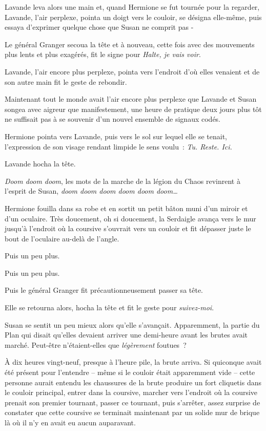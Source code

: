 Lavande leva alors une main et, quand Hermione se fut tournée pour la regarder, Lavande, l'air perplexe, pointa un doigt vers le couloir, se désigna elle-même, puis essaya d'exprimer quelque chose que Susan ne comprit pas -

Le général Granger secoua la tête et à nouveau, cette fois avec des mouvements plus lents et plus exagérés, fit le signe pour \emph{Halte, je vais voir}.

Lavande, l'air encore plus perplexe, pointa vers l'endroit d'où elles venaient et de son autre main fit le geste de rebondir.

Maintenant tout le monde avait l'air encore plus perplexe que Lavande et Susan songea avec aigreur que manifestement, une heure de pratique deux jours plus tôt ne suffisait pas à se souvenir d'un nouvel ensemble de signaux codés.

Hermione pointa vers Lavande, puis vers le sol sur lequel elle se tenait, l'expression de son visage rendant limpide le sens voulu~: \emph{Tu. Reste. Ici.}

Lavande hocha la tête.

\emph{Doom doom doom}, les mots de la marche de la légion du Chaos revinrent à l'esprit de Susan, \emph{doom doom doom doom doom doom…}\footnotemark{}

Hermione fouilla dans sa robe et en sortit un petit bâton muni d'un miroir et d'un oculaire. Très doucement, oh si doucement, la Serdaigle avança vers le mur jusqu'à l'endroit où la coursive s'ouvrait vers un couloir et fit dépasser juste le bout de l'oculaire au-delà de l'angle.

Puis un peu plus.

Puis un peu plus.

Puis le général Granger fit précautionneusement passer sa tête.

Elle se retourna alors, hocha la tête et fit le geste pour \emph{suivez-moi}.

Susan se sentit un peu mieux alors qu'elle s'avançait. Apparemment, la partie du Plan qui disait qu'elles devaient arriver une demi-heure avant les brutes avait marché. Peut-être n'étaient-elles que \emph{légèrement} foutues~?

\later

À dix heures vingt-neuf, presque à l'heure pile, la brute arriva. Si quiconque avait été présent pour l'entendre -- même si le couloir était apparemment vide -- cette personne aurait entendu les chaussures de la brute produire un fort cliquetis dans le couloir principal, entrer dans la coursive, marcher vers l'endroit où la coursive prenait son premier tournant, passer ce tournant, puis s'arrêter, assez surprise de constater que cette coursive se terminait maintenant par un solide mur de brique là où il n'y en avait eu aucun auparavant.

